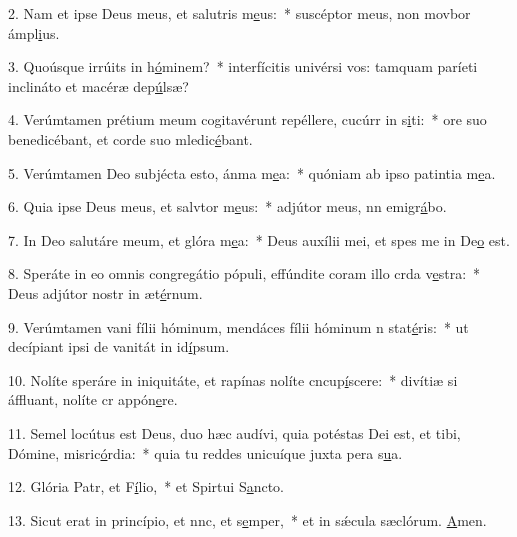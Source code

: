 2. Nam et ipse Deus meus, et salutris m\uline{e}us:~* suscéptor meus, non movbor ámpl\uline{i}us.\par 
3. Quoúsque irrúits in h\uline{ó}minem?~* interfícitis univérsi vos: tamquam paríeti inclináto et macéræ dep\uline{ú}lsæ?\par 
4. Verúmtamen prétium meum cogitavérunt repéllere, cucúrr in s\uline{i}ti:~* ore suo benedicébant, et corde suo mledic\uline{é}bant.\par 
5. Verúmtamen Deo subjécta esto, ánma m\uline{e}a:~* quóniam ab ipso patintia m\uline{e}a.\par 
6. Quia ipse Deus meus, et salvtor m\uline{e}us:~* adjútor meus, nn emigr\uline{á}bo.\par 
7. In Deo salutáre meum, et glóra m\uline{e}a:~* Deus auxílii mei, et spes me in De\uline{o} est.\par 
8. Speráte in eo omnis congregátio pópuli, effúndite coram illo crda v\uline{e}stra:~* Deus adjútor nostr in æt\uline{é}rnum.\par 
9. Verúmtamen vani fílii hóminum, mendáces fílii hóminum n stat\uline{é}ris:~* ut decípiant ipsi de vanitát in id\uline{í}psum.\par 
10. Nolíte speráre in iniquitáte, et rapínas nolíte cncup\uline{í}scere:~* divítiæ si áffluant, nolíte cr appón\uline{e}re.\par 
11. Semel locútus est Deus, duo hæc audívi, quia potéstas Dei est, et tibi, Dómine, misric\uline{ó}rdia:~* quia tu reddes unicuíque juxta pera s\uline{u}a.\par 
12. Glória Patr, et F\uline{í}lio,~* et Spirtui S\uline{a}ncto.\par 
13. Sicut erat in princípio, et nnc, et s\uline{e}mper,~* et in sǽcula sæclórum. \uline{A}men.\par 
